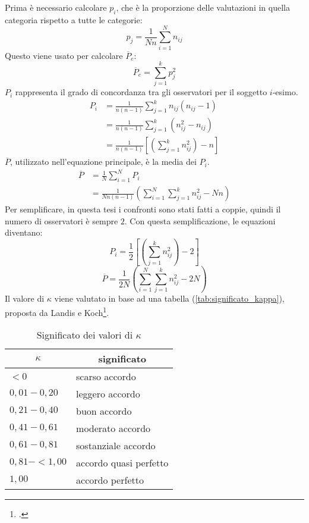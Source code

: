 Prima è necessario calcolare $p_i$, che è la proporzione delle valutazioni in quella categoria rispetto a tutte le categorie:
\begin{equation*}
p_j = \frac{1}{Nn}\sum_{i=1}^N n_{ij}
\end{equation*}
Questo viene usato per calcolare $\overline{P}_e$:
\begin{equation}
\overline{P}_e = \sum_{j=1}^k p^2_j
\end{equation}
$P_i$ rappresenta il grado di concordanza tra gli osservatori per il soggetto $i$-esimo.
\begin{align*}
P_i &= \frac{1}{n(n-1)}\sum_{j=1}^k n_{ij}(n_{ij}-1) \\
&= \frac{1}{n(n-1)}\sum_{j=1}^k (n^2_{ij}-n_{ij}) \\
&= \frac{1}{n(n-1)}[(\sum_{j=1}^k n^2_{ij}) - n]
\end{align*}
$\overline{P}$, utilizzato nell'equazione principale, è la media dei $P_i$.
\begin{align*}
\overline{P} &= \frac{1}{N}\sum_{i=1}^N P_i \\
&= \frac{1}{Nn(n-1)}(\sum_{i=1}^N\sum_{j=1}^k n^2_{ij} - Nn)
\end{align*}
Per semplificare, in questa tesi i confronti sono stati fatti a coppie, quindi il numero di osservatori è sempre $2$. Con questa semplificazione, le equazioni diventano:
\begin{equation}
P_i = \frac{1}{2}[(\sum_{j=1}^k n^2_{ij}) - 2]
\end{equation}
\begin{equation}
\overline{P} = \frac{1}{2N}(\sum_{i=1}^N\sum_{j=1}^k n^2_{ij} - 2N)
\end{equation}
Il valore di $\kappa$ viene valutato in base ad una tabella (\vref*{tab:significato_kappa}), proposta da Landis e Koch\footcite{Landis1977}.
\begin{table}[h!]
\centering
\caption{Significato dei valori di $\kappa$}
\label{tab:significato_kappa}
\begin{tabular}{ll}
\toprule
\multicolumn{1}{c}{\textbf{$\kappa$}} & \multicolumn{1}{c}{significato} \\
\midrule
$< 0$ & scarso accordo \\
$0,01 - 0,20$ & leggero accordo \\
$0,21 - 0,40$ & buon accordo \\
$0,41 - 0,61$ & moderato accordo \\
$0,61 - 0,81$ & sostanziale accordo \\
$0,81 - < 1,00$ & accordo quasi perfetto \\
$1,00$ & accordo perfetto \\
\bottomrule
\end{tabular}
\end{table}

